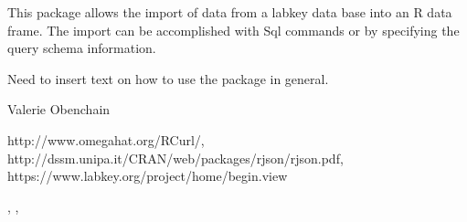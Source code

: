 \begin{Description}\relax
This package allows the import of data from a labkey data base
into an R data frame. The import can be accomplished with Sql
commands or by specifying the query schema information.
\end{Description}
\begin{Details}\relax
{}
Need to insert text on how to use the package in general.
\end{Details}
\begin{Author}\relax
Valerie Obenchain
\end{Author}
\begin{References}\relax
http://www.omegahat.org/RCurl/,
http://dssm.unipa.it/CRAN/web/packages/rjson/rjson.pdf,
https://www.labkey.org/project/home/begin.view
\end{References}
\begin{SeeAlso}\relax
{}, , 
\end{SeeAlso}

